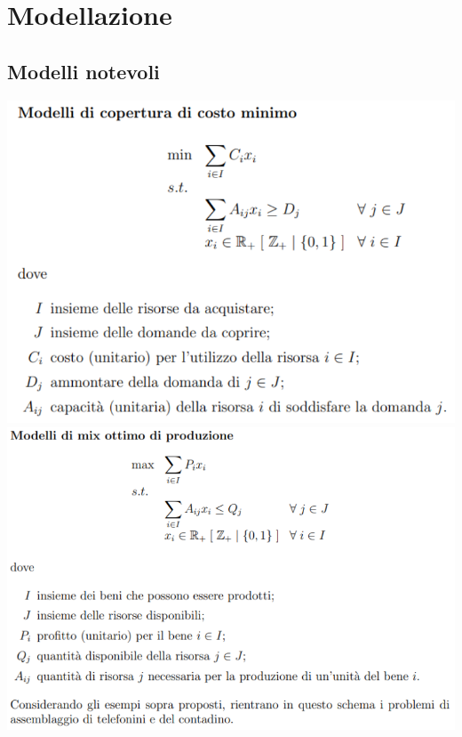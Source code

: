 \section{Modellazione}

\subsection{Modelli notevoli}

\begin{multicols}{2}

\includegraphics[width=\linewidth]{img/copertura-costo-minimo.png}
\includegraphics[width=\linewidth]{img/mix-ottimo.png}

\end{multicols}
